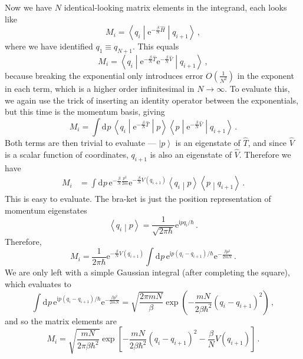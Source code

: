 \documentclass{article}
\theoremstyle{plain}\theoremheaderfont{\normalfont\itshape}\theorembodyfont{\rmfamily}\theoremseparator{.}\newtheorem*{rem}{Remark}\newtheorem*{ex}{Example}\newtheorem*{proof}{Proof}\newtheorem*{altp}{Alternative proof}
\theoremstyle{plain}\theoremheaderfont{\normalfont\bfseries}\theorembodyfont{\rmfamily}\theoremseparator{.}\newtheorem{thm}{Theorem}[section]\newtheorem{lem}[thm]{Lemma}\newtheorem{prop}[thm]{Proposition}\newtheorem*{cor}{Corollary}\newtheorem{defn}[thm]{Definition}\newtheorem{clm}[thm]{Claim}\newtheorem{clminproof}{Claim}
\theoremstyle{break}\theoremheaderfont{\normalfont\itshape}\theorembodyfont{\rmfamily}\theoremseparator{.\medskip}\newtheorem*{proofskip}{Proof}\newtheorem*{exs}{Examples}\newtheorem*{rems}{Remarks}
\theoremstyle{break}\theoremheaderfont{\normalfont\bfseries}\theorembodyfont{\rmfamily}\theoremseparator{.\medskip}\newtheorem{lemskip}[thm]{Lemma}\newtheorem{defnskip}[thm]{Definition}\newtheorem{propskip}[thm]{Proposition}\newtheorem{thmskip}[thm]{Theorem}
\numberwithin{equation}{section}
\newcommand{\ii}{\mathrm{i}}
\newcommand{\ee}{\mathrm{e}}
\newcommand{\dd}[2][]{\mathrm{d}^{#1} #2\,}
\newcommand{\ket}[1]{\left| #1 \right\rangle}
\newcommand{\braket}[2]{\left\langle #1 \middle| #2 \right\rangle}
\newcommand{\mel}[3]{\left\langle #1 \middle| #2 \middle| #3 \right\rangle}
\begin{document}
    Now we have \(N\) identical-looking matrix elements in the integrand, each looks like
    \begin{equation}
        M_i=\mel{q_i}{\ee^{-\frac{\beta}{N}\hat{H}}}{q_{i+1}}\,,
    \end{equation}
    where we have identified \(q_{1}\equiv q_{N+1}\). This equals
    \begin{equation}
        M_i=\mel{q_i}{\ee^{-\frac{\beta}{N}\hat{T}}\ee^{-\frac{\beta}{N}\hat{V}}}{q_{i+1}}\,,
    \end{equation}
    because breaking the exponential only introduces error \(O(\frac{1}{N^2})\) in the exponent in each term, which is a higher order infinitesimal in \(N\to\infty\). To evaluate this, we again use the trick of inserting an identity operator between the exponentials, but this time is the momentum basis, giving
    \begin{equation}
        M_i=\int\dd{p}\mel{q_i}{\ee^{-\frac{\beta}{N}\hat{T}}}{p}\mel{p}{\ee^{-\frac{\beta}{N}\hat{V}}}{q_{i+1}}\,.
    \end{equation}
    Both terms are then trivial to evaluate --- \(\ket{p}\) is an eigenstate of \(\hat{T}\), and since \(\hat{V}\) is a scalar function of coordinates, \(q_{i+1}\) is also an eigenstate of \(\hat{V}\). Therefore we have
    \begin{align}
        M_i&=\int\dd{p}\ee^{-\frac{\beta}{N}\frac{p^2}{2m}}\ee^{-\frac{\beta}{N}V(q_{i+1})}\braket{q_i}{p}\braket{p}{q_{i+1}}\,.
    \end{align}
    This is easy to evaluate. The bra-ket is just the position representation of momentum eigenstates
    \begin{equation}
        \braket{q_i}{p}=\frac{1}{\sqrt{2\pi\hbar}}\ee^{\ii p q_i/\hbar}\,.
    \end{equation}
    Therefore,
    \begin{equation}
       M_i=\frac{1}{2\pi\hbar}\ee^{-\frac{\beta}{N}V(q_{i+1})}\int\dd{p} \ee^{\ii p (q_i-q_{i+1})/\hbar}\ee^{-\frac{\beta p^2}{2mN}}\,.
    \end{equation}
    We are only left with a simple Gaussian integral (after completing the square), which evaluates to
    \begin{equation}
        \int\dd{p} \ee^{\ii p (q_i-q_{i+1})/\hbar}\ee^{-\frac{\beta p^2}{2mN}}=\sqrt{\frac{2\pi mN}{\beta}}\exp\left(-\frac{mN}{2\beta\hbar^2}(q_i - q_{i+1})^2\right)\,,
    \end{equation}
    and so the matrix elements are
    \begin{equation}
        M_i=\sqrt{\frac{mN}{2\pi\beta\hbar^2}}\exp\left[-\frac{mN}{2\beta\hbar^2}(q_i - q_{i+1})^2-\frac{\beta}{N}V(q_{i+1})\right]\,.
    \end{equation}
\end{document}
